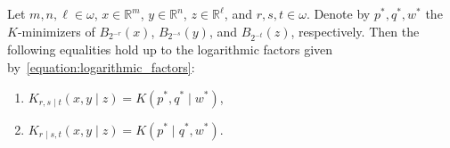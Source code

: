 \begin{lemma}
    \label{lemma:conditional_pairwise_complexity_by_K_minimizers_and_dyadic_truncation}
    Let $m, n, \ell \in \omega$, $x \in \mathbb{R}^m$, $y \in \mathbb{R}^n$, $z \in \mathbb{R}^\ell$, and $r, s, t \in \omega$. Denote by $p^*, q^*, w^*$ the $K$-minimizers of $B_{2^{-r}}(x)$, $B_{2^{-s}}(y)$, and $B_{2^{-t}}(z)$, respectively. Then the following equalities hold up to the logarithmic factors given by~\eqref{equation:logarithmic_factors}:
    \begin{enumerate}[label = (\roman*)]
        \item $K_{r, s \mid t}(x, y \mid z) = K(p^*, q^* \mid w^*)$,
        \item $K_{r \mid s, t}(x, y \mid z) = K(p^* \mid q^*, w^*)$.
    \end{enumerate}
\end{lemma}
